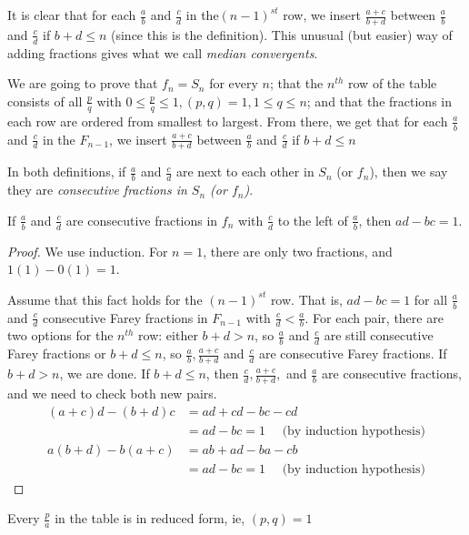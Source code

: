 \documentclass{ximera}
\begin{document}
It is clear that for each $\frac{a}{b}$ and $\frac{c}{d}$ in the$(n-1)^{st}$ row, we insert $\frac{a+c}{b+d}$ between $\frac{a}{b}$ and $\frac{c}{d}$ if $b+d\leq n$ (since this is the definition). This unusual (but easier) way of adding fractions gives what we call \emph{median convergents}.

We are going to prove that $f_n=S_n$ for every $n$;  that the $n^{th}$ row of the table consists of all $\frac{p}{q}$ with $0\leq \frac{p}{q}\leq 1, (p,q)=1, 1\leq q  \leq n$; and that the fractions in each row are ordered from smallest to largest. From there, we get that for each $\frac{a}{b}$ and $\frac{c}{d}$ in the  $F_{n-1}$, we insert $\frac{a+c}{b+d}$ between $\frac{a}{b}$ and $\frac{c}{d}$ if $b+d\leq n$ 

In both definitions, if $\frac{a}{b}$ and $\frac{c}{d}$ are next to each other in $S_n$ (or $f_n$), then we say they are \emph{consecutive fractions in $S_n$ (or $f_n$)}.

\begin{theorem}
 If $\frac{a}{b}$ and $\frac{c}{d}$ are consecutive fractions in $f_n$ with $\frac{c}{d}$ to the left of $\frac{a}{b}$, then $ad-bc=1$.
\end{theorem}
\begin{proof}
 We use induction. For $n=1$, there are only two fractions, and $1(1)-0(1)=1$.
 
 Assume that this fact holds for the $(n-1)^{st}$ row. That is, $ad-bc=1$ for all $\frac{a}{b}$ and $\frac{c}{d}$ consecutive Farey fractions in $F_{n-1}$ with $\frac{c}{d}<\frac{a}{b}$. For each pair, there are two options for the $n^{th}$ row: either $b+d>n$, so $\frac{a}{b}$ and $\frac{c}{d}$ are still consecutive Farey fractions or $b+d\leq n$, so $\frac{a}{b},\frac{a+c}{b+d}$ and $\frac{c}{d}$ are consecutive Farey fractions. If $b+d>n$, we are done. If $b+d\leq n$, then $\frac{c}{d},\frac{a+c}{b+d},$ and $\frac{a}{b}$ are consecutive fractions, and we need to check both new pairs.
\begin{align*}
 (a+c)d-(b+d)c&=ad+cd-bc-cd\\
 &=ad-bc=1 \quad\textrm{ (by induction hypothesis)}\\
 a(b+d)-b(a+c)&=ab+ad-ba-cb\\
 &=ad-bc=1 \quad\textrm{ (by induction hypothesis)}
\end{align*}
\end{proof}

\begin{corollary}
 Every $\frac{p}{a}$ in the table is in reduced form, ie, $(p,q)=1$
\end{corollary}
\end{document}
